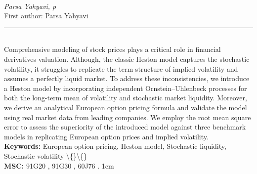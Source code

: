 \documentclass[10pt,twoside]{article}
\begin{document}
\noindent\begin{minipage}[t][\textheight]{\textwidth}
\\[0.35em]
{\itshape Parsa Yahyavi, p}\\[0.2em]
{\footnotesize First author: Parsa Yahyavi}\\[0.45em]
\noindent\rule{\textwidth}{0.3pt}\\[0.4em]
{\footnotesize  Comprehensive modeling of stock prices plays a critical role in financial derivatives valuation. Although, the classic Heston model captures the stochastic volatility, it struggles to replicate the term structure of implied volatility and assumes a perfectly liquid market. To address these inconsistencies, we introduce a Heston model by incorporating independent Ornstein--Uhlenbeck processes for both the long-term mean of volatility and stochastic market liquidity. Moreover, we derive an analytical European option pricing formula and validate the model using real market data from leading companies. We employ the root mean square error to assess the superiority of the introduced model against three benchmark models in replicating European option prices and implied volatility.}\\[0.4em]
{\footnotesize\bfseries Keywords:} {\footnotesize European option pricing, Heston model, Stochastic liquidity, Stochastic volatility \textbackslash\{\}\textbackslash\{\}}\\[0.15em]
{\footnotesize\bfseries MSC:} {\footnotesize 91G20 , 91G30 , 60J76 . 1cm}\\
\vfill
\end{minipage}
\newpage
\end{document}

